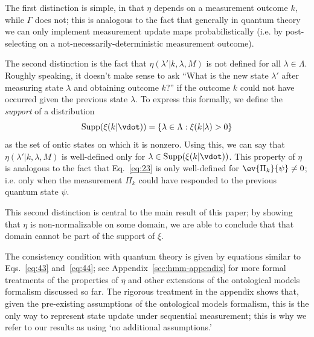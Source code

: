 \documentclass[%
 reprint,
superscriptaddress,
nofootinbib,
 amsmath,amssymb,
 prx, 
 accepted=2019-09-27,
]{quantumarticle}
\newcommand{\supp}{\textup{Supp}}
\begin{document}
The first distinction is simple, in that $\eta$ depends on a
measurement outcome $k$, while $\Gamma$ does not; this is analogous to
the fact that generally in quantum theory we can only implement
measurement update maps probabilistically (i.e. by post-selecting on a
not-necessarily-deterministic measurement outcome).

The second distinction is the fact that $\eta(\lambda'|k,\lambda,M)$
is not defined for all $\lambda\in\Lambda$. Roughly speaking, it
doesn't make sense to ask ``What is the new state $\lambda'$ after
measuring state $\lambda$ and obtaining outcome $k$?'' if the outcome
$k$ could not have occurred given the previous state $\lambda$. To
express this formally, we define the \emph{support} of a distribution
\begin{equation}
  \label{eq:42}
  \supp(\xi(k|\vdot))=\{\lambda\in\Lambda:\xi(k|\lambda)>0\}
\end{equation}
as the set of ontic states on which it is nonzero. Using this, we can
say that $\eta(\lambda'|k,\lambda,M)$ is well-defined only for
$\lambda\in\supp(\xi(k|\vdot))$. This property of $\eta$ is analogous
to the fact that Eq.~\ref{eq:23} is only well-defined for
$\ev{\Pi_k}{\psi}\neq 0$; i.e. only when the measurement $\Pi_k$ could
have responded to the previous quantum state $\psi$.

This second distinction is central to the main result of this paper;
by showing that $\eta$ is non-normalizable on some domain, we are able
to conclude that that domain cannot be part of the support of $\xi$.

The consistency condition with quantum theory is given by equations
similar to Eqs.~\ref{eq:43} and~\ref{eq:44}; see
Appendix~\ref{sec:hmm-appendix} for more formal treatments of the
properties of $\eta$ and other extensions of the ontological models
formalism discussed so far. The rigorous treatment in the appendix
shows that, given the pre-existing assumptions of the ontological
models formalism, this is the only way to represent state update under
sequential measurement; this is why we refer to our results as using
`no additional assumptions.'
\end{document}
